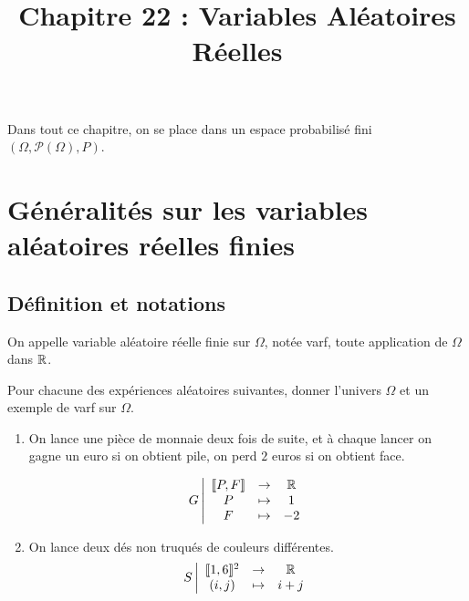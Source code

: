 \documentclass[a4paper, 11pt]{article}
\begin{document}
\tableofcontents
 \title{Chapitre 22  : Variables Aléatoires Réelles} 



 Dans tout ce chapitre, on se place dans un espace probabilis\'e fini $(\Omega, \mathcal{P}(\Omega),P)$.

\section{G\'en\'eralit\'es sur les variables al\'eatoires r\'eelles finies}

\subsection*{D\'efinition et notations}

 {  

\begin{defi} On appelle variable al\'eatoire r\'eelle finie sur $\Omega$, not\'ee varf, toute application de $\Omega$ dans $\mathbb{R}$. 


\end{defi}
 
}

\begin{exemple}
Pour chacune des exp\'eriences al\'eatoires suivantes, donner l'univers $\Omega$ et un exemple de varf sur $\Omega$.
\begin{enumerate}
\item On lance une pi\`ece de monnaie deux fois de suite, et \`a chaque lancer on gagne un euro si on obtient pile, on perd $2$ euros si on obtient face.

$$G \left|\begin{array}{ccc}
 \llbracket P,F\rrbracket& \rightarrow &\mathbb{R} \\
 P&\mapsto & 1\\
 F&\mapsto & -2\\
\end{array}\right.$$

\item On lance deux d\'es non truqu\'es de couleurs diff\'erentes.
$$S \left|\begin{array}{ccc}
 \llbracket 1,6\rrbracket^2& \rightarrow &\mathbb{R} \\
 (i,j)&\mapsto &i+j
\end{array}\right.$$

\end{enumerate}
\end{exemple}
\end{document}
